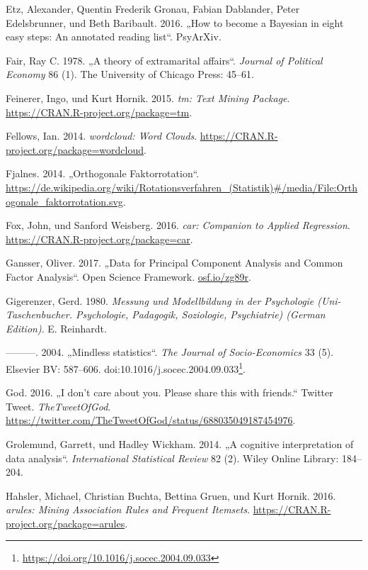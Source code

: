 \documentclass[12pt,ngerman,]{book}
\let\rmarkdownfootnote\footnote%
\def\footnote{\protect\rmarkdownfootnote}
\renewcommand{\href}[2]{#2\footnote{\url{#1}}}
\theoremstyle{definition}
\theoremstyle{definition}
\theoremstyle{remark}
\begin{document}
\hypertarget{ref-etz2016become}{}
Etz, Alexander, Quentin Frederik Gronau, Fabian Dablander, Peter
Edelsbrunner, und Beth Baribault. 2016. „How to become a Bayesian in
eight easy steps: An annotated reading list``. PsyArXiv.

\hypertarget{ref-fair1978theory}{}
Fair, Ray C. 1978. „A theory of extramarital affairs``. \emph{Journal of
Political Economy} 86 (1). The University of Chicago Press: 45--61.

\hypertarget{ref-R-tm}{}
Feinerer, Ingo, und Kurt Hornik. 2015. \emph{tm: Text Mining Package}.
\url{https://CRAN.R-project.org/package=tm}.

\hypertarget{ref-R-wordcloud}{}
Fellows, Ian. 2014. \emph{wordcloud: Word Clouds}.
\url{https://CRAN.R-project.org/package=wordcloud}.

\hypertarget{ref-fjalnes_orthogonale_2014}{}
Fjalnes. 2014. „Orthogonale Faktorrotation``.
\url{https://de.wikipedia.org/wiki/Rotationsverfahren_(Statistik)\#/media/File:Orthogonale_faktorrotation.svg}.

\hypertarget{ref-R-car}{}
Fox, John, und Sanford Weisberg. 2016. \emph{car: Companion to Applied
Regression}. \url{https://CRAN.R-project.org/package=car}.

\hypertarget{ref-Gansser_2017}{}
Gansser, Oliver. 2017. „Data for Principal Component Analysis and Common
Factor Analysis``. Open Science Framework. \url{osf.io/zg89r}.

\hypertarget{ref-gigerenzer1980}{}
Gigerenzer, Gerd. 1980. \emph{Messung und Modellbildung in der
Psychologie (Uni-Taschenbucher. Psychologie, Padagogik, Soziologie,
Psychiatrie) (German Edition)}. E. Reinhardt.

\hypertarget{ref-Gigerenzer2004}{}
---------. 2004. „Mindless statistics``. \emph{The Journal of
Socio-Economics} 33 (5). Elsevier BV: 587--606.
doi:\href{https://doi.org/10.1016/j.socec.2004.09.033}{10.1016/j.socec.2004.09.033}.

\hypertarget{ref-god_i_2016}{}
God. 2016. „I don't care about you. Please share this with friends.``
Twitter Tweet. \emph{TheTweetOfGod}.
\url{https://twitter.com/TheTweetOfGod/status/688035049187454976}.

\hypertarget{ref-grolemund2014cognitive}{}
Grolemund, Garrett, und Hadley Wickham. 2014. „A cognitive
interpretation of data analysis``. \emph{International Statistical
Review} 82 (2). Wiley Online Library: 184--204.

\hypertarget{ref-R-arules}{}
Hahsler, Michael, Christian Buchta, Bettina Gruen, und Kurt Hornik.
2016. \emph{arules: Mining Association Rules and Frequent Itemsets}.
\url{https://CRAN.R-project.org/package=arules}.
\end{document}
